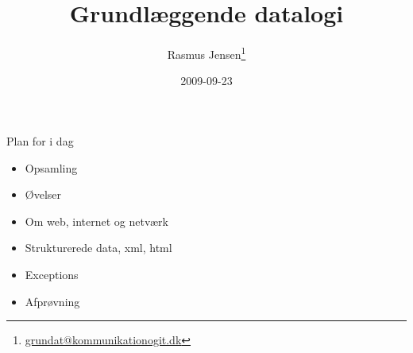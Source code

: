 \documentclass[a4paper,landscape]{slides}
\title{Grundlæggende datalogi}
\author{Rasmus Jensen\footnote{\url{grundat@kommunikationogit.dk}}}
\date{2009-09-23}
\begin{document}
\maketitle

\begin{comment}
- Opsamling
  - Objekter

- Øvelser
   - Lav et program der tegner en "random walk". Start i et punkt på skærmen og tegn/gå i en tilfældig retning. I det nye punkt tegnes derefter i en ny tilfældig retning og så fremdeles.
     - Sikr at programmet ikke tegner uden for skærmen.
     - Ændr programmet, så det ikke tegner i punktet, men i stedet gør punktet lysere

  - Ændr lightcycle: 
    - så det skrive ud hvem der har vundet
    - så der er tre spillere i stedet for to
    - så man skal angive antallet af spillere i starten
    - så man spiller 3 runder, og den først derefter skriver ud hvem der har vundet

  - Lav en klasse der kan repræsentere en dato. Tag eventuelt udgangspunkt i tids-eksemplet i noterne.
    - Lav en metode (funktion i klassen) så man kan lægge et antal dage til en dato og derved få en ny dato.
    - Lav en metode til at finde antallet af dage mellem to datoer.
  

  - Lav et funktion der gennemløber en streng og skriver hvert enkelt bogstav ud
    - ændr funktion , så det fortolker hvert bogstav som en tegneinstruktion, i.e. 'f' betyder tegn fremad, 'r' betyder drej til højre, 'l' betyder drej til venstre, og andre bogstaver ignoreres. Vinklen der drejes kan eksempelvis være 60 grader.
    - Brug programmet til at tegne strengen 'flfrrflf'
    - Lav en ny funktion der tager en streng som parameter, og retunerer en ny streng hvor alle 'f' i den oprindelige streng er erstattet med 'flfrrflf'.
    - Kald erstatnings-funktionen nogle gange på strengen "frrfrrf", og brug derefter tegne-funktionen til at tegne den resulterende streng
    - Eksperimenter med andre substitioner...

- Kommandoprompt og versionskontrol

- Introduktion til web og internet.

- Strukturerede data, XML, html
 
\end{comment}
\begin{slide}
	\begin{center} {\large 
            Plan for i dag
	} \end{center}
	\begin{itemize} \addtolength{\itemsep}{-\baselineskip}
		\item Opsamling
		\item Øvelser
		\item Om web, internet og netværk
                \item Strukturerede data, xml, html
		\item Exceptions
		\item Afprøvning
	\end{itemize}
\end{slide}
\end{document}
